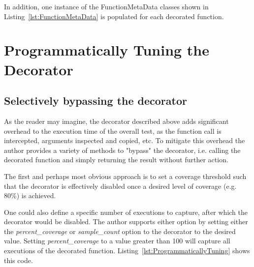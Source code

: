 
In addition, one instance of the FunctionMetaData classes shown in 
Listing~\ref{lst:FunctionMetaData} is populated for each decorated function.



\section{Programmatically Tuning the Decorator}\label{sec:decorator tuning}

\subsection{Selectively bypassing the decorator}\label{sec:tuning-1}

As the reader may imagine, the decorator described above adds significant overhead 
to the execution time of the overall test, as the function call is intercepted,
arguments inspected and copied, etc.  To mitigate this overhead the author provides 
a variety of methods to "bypass" the decorator, i.e. calling the decorated 
function and simply returning the result without further action.

The first and perhaps most obvious approach is to set a coverage threshold such 
that the decorator is effectively disabled once a desired level of coverage 
(e.g. 80\%) is achieved. 

One could also define a specific number 
of executions to capture, after which the decorator would be disabled. 
The author supports either option by setting either the \textit{percent\_coverage} or 
\textit{sample\_count} option to the decorator to the desired value.  Setting 
\textit{percent\_coverage} to a value greater than 100 will capture all 
executions of the decorated function.  Listing~\ref{lst:ProgrammaticallyTuning}
shows this code.


